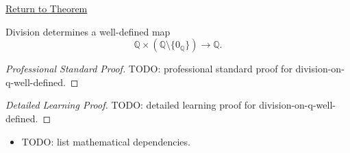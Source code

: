 \newpage
{}
\label{prf:division-on-q-well-defined}

\begin{remark*}[Return]
\hyperref[thm:division-on-q-well-defined]{Return to Theorem}
\end{remark*}

\begin{theorem*}
Division determines a well-defined map
\[
\mathbb{Q}\times(\mathbb{Q}\setminus\{0_{\mathbb{Q}}\})\to\mathbb{Q}.
\]
\end{theorem*}

\begin{proof}[Professional Standard Proof]
\LRAProofBodyStart
TODO: professional standard proof for division-on-q-well-defined.
\end{proof}

\begin{proof}[Detailed Learning Proof]
\LRAProofBodyStart
TODO: detailed learning proof for division-on-q-well-defined.
\end{proof}

\begin{remark*}
\end{remark*}

\begin{dependencies}
\begin{itemize}
  \item TODO: list mathematical dependencies.
\end{itemize}
\end{dependencies}

\clearpage
